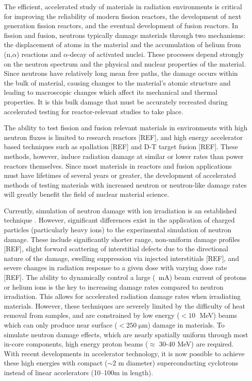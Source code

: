 \documentclass[final,3p,times,twocolumn]{elsarticle} %
\begin{document}
The efficient, accelerated study of materials in radiation environments is critical for improving the reliability of modern fission reactors, the development of next generation fission reactors, and the eventual development of fusion reactors.  In fission and fusion, neutrons typically damage materials through two mechanisms: the displacement of atoms in the material and the accumulation of helium from (n,$\alpha$) reactions and $\alpha$-decay of activated nuclei.  These processes depend strongly on the neutron spectrum and the physical and nuclear properties of the material.  Since neutrons have relatively long mean free paths, the damage occurs within the bulk of material, causing changes to the material's atomic structure and leading to macroscopic changes which affect its mechanical and thermal properties. It is this bulk damage that must be accurately recreated during accelerated testing for reactor-relevant studies to take place.

The ability to test fission and fusion relevant materials in environments with high neutron fluxes is limited to research reactors [REF], and high energy accelerator based techniques such as spallation [REF] and D-T target fusion [REF].  These methods, however, induce radiation damage at similar or lower rates than power reactors themselves.  Since most materials in reactors and fusion applications must have lifetimes of several years or greater, the development of accelerated methods of testing materials with increased neutron or neutron-like damage rates will greatly benefit the field of nuclear material science.

Currently, simulation of neutron damage with ion irradiation is an established technique \cite{Was,ASTME521}.  However, significant differences exist in the application of charged particles (particularly heavy ions) to the experimental simulation of neutron damage. These include significantly shorter range, non-uniform damage profiles [REF], slight forward scattering of interstitial defects due to the directional nature of the damage, swelling suppression via injected interstitials [REF], and severe changes in radiation response to a given dose with varying dose rate [REF]. The ability to dynamically control a large (~mA) beam current of protons or helium ions is the key to increasing damage rates compared to neutron irradiation. This allows for accelerated radiation damage rates when irradiating materials.  However, these techniques are severely limited by the difficulty of heat removal from samples, and are constrained by low energy ($<10\;$ MeV) beams which can only produce near surface ($<250\;\mathrm{\mu m}$) damage in materials.  To simulate neutron damage effects, which are nearly spatially uniform through most in-core components, high energy proton beams ($\approx$ 30-40 MeV) are required. With recent developments in accelerator technology, it is now possible to achieve these high energies with compact ($\sim$2 m diameter) superconducting cyclotrons instead of linear accelerators (10--100m in length).
\end{document}

